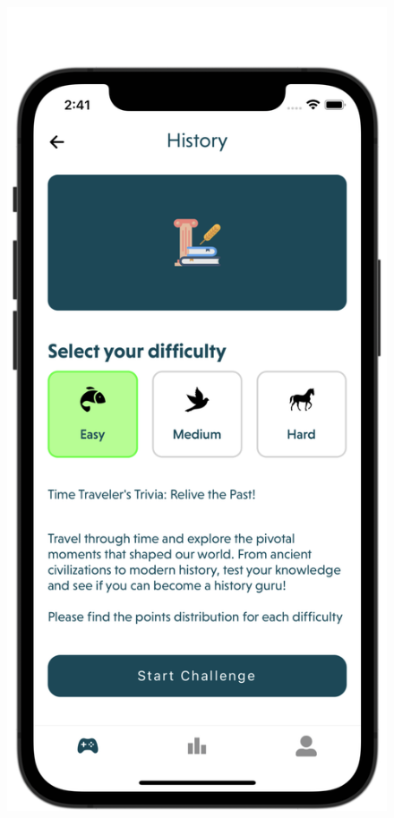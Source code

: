\begin{figure}[H]
    \centering
    \begin{minipage}[b]{0.43\linewidth}
        \centering
        \includegraphics[width=\linewidth]{Mobile UI/Easy Level Quiz.png}

\end{minipage}
\end{figure}
